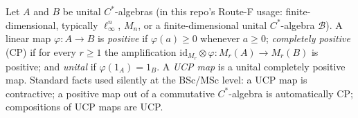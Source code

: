 \hypertarget{def:ucp-map}{}%
\begin{definition}\label{def:ucp-map}
Let $A$ and $B$ be unital $C^*$-algebras (in this repo's
Route-F usage: finite-dimensional, typically $\ell_\infty^n$, $M_n$, or a
finite-dimensional unital $C^*$-algebra $\mathcal B$). A linear map
$\varphi:A\to B$ is \emph{positive} if $\varphi(a)\ge0$ whenever $a\ge0$;
\emph{completely positive} (CP) if for every $r\ge1$ the amplification
$\mathrm{id}_{M_r}\otimes\varphi: M_r(A)\to M_r(B)$ is positive; and
\emph{unital} if $\varphi(1_A)=1_B$. A \emph{UCP map} is a unital completely positive
map. Standard facts used silently at the BSc/MSc level: a UCP map is
contractive; a positive map out of a commutative $C^*$-algebra is
automatically CP; compositions of UCP maps are UCP.
\end{definition}

